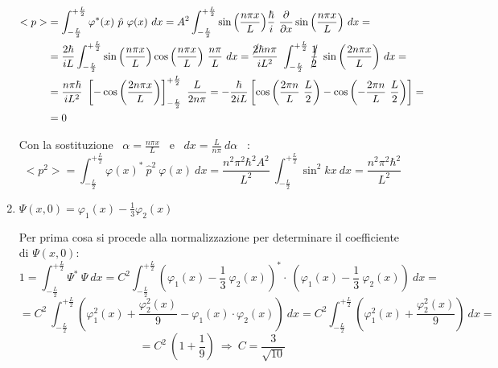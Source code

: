 \documentclass[12pt,twoside,a4]{article}
\begin{document}
\begin{solution}
\begin{enumerate}[label=(\textit{\roman*})]
\begin{align*} 
    < p > 
    &= \int_{-\frac{L}{2}}^{+\frac{L}{2}} {\varphi^\ast(x) \ \hat{p} \ \varphi(x)} \ dx
    = A^2 \int_{-\frac{L}{2}}^{+\frac{L}{2}} \sin{\left( \frac{n \pi x}{L} \right)} \frac{\hbar}{i} \ \frac{\partial}{\partial x} \sin{\left( \frac{n \pi x}{L} \right)} \ dx = 
    \\
    &= \frac{2\hbar}{iL} \int_{-\frac{L}{2}}^{+\frac{L}{2}} \sin{\left( \frac{n \pi x}{L} \right)} \cos{\left( \frac{n \pi x}{L} \right)} \ \frac{n \pi}{L} \ dx
    =\frac{\cancel{2} \hbar n \pi}{i L^2} \ \int_{-\frac{L}{2}}^{+\frac{L}{2}} \cancel{\frac{1}{2}} \ \sin{\left( \frac{2 n \pi x}{L}\right) } \ dx = \\
    &= \frac{n \pi \hbar}{i L^2} \ \left[ -\cos{\left( \frac{2 n \pi x}{L} \right)} \right]_{-\frac{L}{2}}^{+\frac{L}{2}} \ \frac{L}{2 n \pi} 
    = -\frac{\hbar}{2 i L} \left[ \cos{ \left( \frac{2 \pi n}{L} \ \frac{L}{2} \right) } - \cos{ \left( -\frac{2 \pi n}{L} \ \frac{L}{2} \right)} \right] =
    \\
    & =  0       
\end{align*}

Con la sostituzione \ $\alpha = \frac{n \pi x}{L}$ \ e \ $dx = \frac{L }{n \pi} \ d\alpha$ \ : 
\begin{equation*}
    < p^2 > = \int_{-\frac{L}{2}}^{+\frac{L}{2}} {\varphi(x)^\ast \ \hat{p}^2 \ \varphi(x)} \ dx = \frac{n^2 \pi^2 \hbar^2 A^2}{L^2} \ \int_{-\frac{L}{2}}^{+\frac{L}{2}} {\sin^2{kx}} \ dx = \frac{n^2 \pi^2 \hbar^2}{L^2}   
\end{equation*}

\item $\Psi(x,0) = \varphi_1(x) - \frac{1}{3} \varphi_2(x)$

Per prima cosa si procede alla normalizzazione per determinare il coefficiente di $\Psi(x,0)$: \begin{equation*}
1 = \int_{-\frac{L}{2}}^{+\frac{L}{2}} {\Psi^\ast \ \Psi} \ dx = C^2 \int_{-\frac{L}{2}}^{+\frac{L}{2}} {\left(\varphi_1(x)- \frac{1}{3}\ \varphi_2(x)\right)^\ast \cdot \ \left(\varphi_1(x)- \frac{1}{3} \ \varphi_2(x)\right)} \ dx  =     
\end{equation*}
\begin{equation*}
 = C^2 \ \int_{-\frac{L}{2}}^{+\frac{L}{2}} {\left( \varphi^2_1(x) +\frac{\varphi^2_2(x)}{9} - \varphi_1(x) \cdot \varphi_2(x) \right) } \ dx = C^2 \int_{-\frac{L}{2}}^{+\frac{L}{2}} {\left( \varphi^2_1(x) +\frac{\varphi^2_2(x)}{9} \right) } \ dx =    
\end{equation*}
\begin{equation*}
    = C^2 \ \left( 1 + \frac{1}{9}     \right)  \  \Rightarrow  \   C = \frac{3}{\sqrt{10}} 
\end{equation*}


\end{enumerate}
\end{solution}
\end{document}
